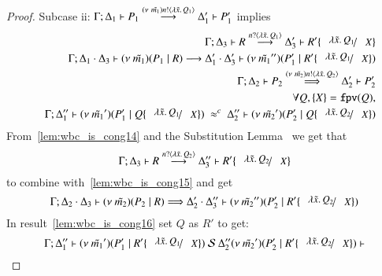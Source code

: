 \begin{proof}
	\noi Subcase ii:
	$\Gamma; \Delta_1 \vdash P_1 \stackrel{(\nu\ \tilde{m_1}) n ! \langle \lambda \tilde{x}.\,Q_1 \rangle}{\longrightarrow} \Delta_1' \vdash P_1'$
	implies
%
	\begin{eqnarray}
		& & \horel{\Gamma}{\Delta_3}{R}{\by{\bactinp{n}{\abs{\tilde{x}} {Q_1}}}}{\Delta_3'}{R' \subst{\abs{\tilde{x}}{Q_1}}{X}}
		\label{lem:wbc_is_cong14}\\
		& & \horel{\Gamma}{\Delta_1 \cat \Delta_3}{\newsp{\tilde{m_1}}{P_1 \Par R}}{\by{}}{\Delta_1' \cat \Delta_3'}{\newsp{\tilde{m_1}''}{P_1' \Par R' \subst{\abs{\tilde{x}}{Q_1}}{X}}}
		\nonumber \\
		& & \horel{\Gamma}{\Delta_2}{P_2}{\By{\news{\tilde{m_2}} \bactout{n}{\abs{\tilde{x}}{Q_2}}}}{\Delta_2'}{P_2'}
		\label{lem:wbc_is_cong15}\\
		& & \forall Q, \set{X} = \fpv{Q}, \nonumber \\
		& & \horel{\Gamma}{\Delta_1''}{\newsp{\tilde{m_1}'}{P_1' \Par Q \subst{\abs{\tilde{x}}{Q_1}}{X}}}{\ \wbc\ }{\Delta_2''}{\newsp{\tilde{m_2}'}{P_2' \Par Q \subst{\abs{\tilde{x}}{Q_2}}{X}}}
		\label{lem:wbc_is_cong16}
	\end{eqnarray}
%
	From~\ref{lem:wbc_is_cong14} and the Substitution Lemma~ we get that
	\[
		\horel{\Gamma}{\Delta_3}{R}{\by{\bactinp{n}{\abs{\tilde{x}} {Q_2}}}}{\Delta_3''}{R' \subst{\abs{\tilde{x}}{Q_2}}{X}}
	\]
	\noi to combine with~\ref{lem:wbc_is_cong15} and get
	\[
		\horel{\Gamma}{\Delta_2 \cat \Delta_3}{\newsp{\tilde{m_2}}{P_2 \Par R}}{\By{}}{\Delta_2' \cat \Delta_3''}{\newsp{\tilde{m_2}''}{P_2' \Par R' \subst{\abs{\tilde{x}}{Q_2}}{X}}}
	\]
%
	\noi In result~\ref{lem:wbc_is_cong16} set $Q$ as $R'$ to get:
%
	\[
		\horel{\Gamma}{\Delta_1''}{\newsp{\tilde{m_1}'}{P_1' \Par R' \subst{\abs{\tilde{x}}{Q_1}}{X}}}
		{\ \mathcal{S}\ \Delta_2''}
		{\newsp{\tilde{m_2}'}{P_2' \Par R' \subst{\abs{\tilde{x}}{Q_2}}{X}}}
	\]


\end{proof}
